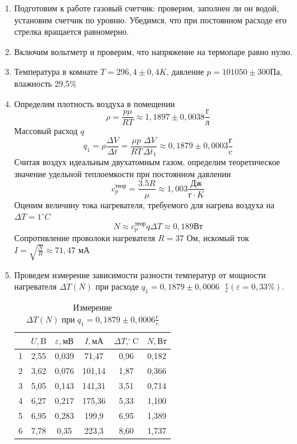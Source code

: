 \documentclass[a4paper]{article}
\begin{document}
\begin{enumerate}
\item Подготовим к работе газовый счетчик: проверим, заполнен ли он водой, установим счетчик по уровню. Убедимся, что при постоянном расходе его стрелка вращается равномерно.
\item Включим вольтметр и проверим, что напряжение на термопаре равно нулю.
\item Температура в комнате $T = 296,4\pm0,4K$, давление $p = 101050\pm300 \text{Па}$, влажность 29,5\%
\item Определим плотность воздуха в помещении
\begin{equation*}
	\rho = \frac{p\mu}{RT} \stackrel{}{\approx} 1,1897 \pm 0,0038\frac{\text{г}}{\text{л}}
\end{equation*}
Массовый расход $q$
\begin{equation*}
	q_1 = \rho \frac{\Delta V}{\Delta t} = \frac{\mu p}{RT} \frac{\Delta V}{\Delta t_1} \stackrel{}{\approx} 0,1879 \pm 0,0003 \frac{\text{г}}{\text{c}}
\end{equation*}
Считая воздух идеальным двухатомным газом, определим теоретическое значение удельной теплоемкости при постоянном давлении
\begin{equation*}
	c_{p}^{теор} = \frac{3.5R}{\mu} \approx 1,003 \frac{\text{Дж}}{\text{г}\cdot K}
\end{equation*}
Оценим величину тока нагревателя, требуемого для нагрева воздуха на $\Delta T = 1 ^\circ C$
\begin{equation*}
	N \approx  c_{p}^{теор} q  \Delta T \approx 0,189 \text{Вт}
\end{equation*}
Сопротивление проволоки нагревателя $R = 37 \text{ Ом}$, искомый ток $I = \sqrt{\frac{N}{R}} \approx 71,47 \text{ мА}$
\item Проведем измерение зависимости разности температур от мощности нагревателя $\Delta T(N)$ при расходе $q_1 = 0,1879 \pm 0,0006 \text{ }\frac{\text{г}}{\text{c}} (\varepsilon = 0,33\%)$.
\begin{table}[h!] 
			\caption{Измерение $\Delta T (N) \; {при} \; q_1 = 0,1879 \pm 0,0006 \frac{\text{г}}{\text{c}}$}
			\begin{center}
				\begin{tabular}{|*{6}{c|}}
					\hline
					\textnumero & $U, \text{B} $ & $\varepsilon,  \text{мВ}$ & $I, \text{мА}$ & $\Delta T, ^\circ\text{C}$ & $N,  \text{Вт} $\\ \hline
					1	& 2,55	 & 0,039 & 71,47	 & 0,96 & 0,182\\ \hline
					2	& 3,62 & 	0,076	& 101,14	&1,87&	0,366\\ \hline
					3	&5,05&	0,143	&141,31	&3,51	&0,714\\ \hline
					4	&	6,27&	0,217	&175,36&	5,33&	1,100\\ \hline
					5	&6,95&	0,283	&199,9	&6,95&	1,389\\ \hline
					6	&7,78&	0,35&	223,3	&8,60&	1,737\\ \hline
				\end{tabular}
			\end{center}
		\end{table}



\end{enumerate}
\end{document}
